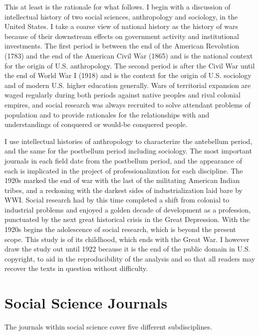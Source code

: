 \documentclass[]{book}
\theoremstyle{definition}
\theoremstyle{definition}
\theoremstyle{definition}
\theoremstyle{remark}
\begin{document}
This at least is the rationale for what follows. I begin with a
discussion of intellectual history of two social sciences, anthropology
and sociology, in the United States. I take a coarse view of national
history as the history of wars because of their downstream effects on
government activity and institutional investments. The first period is
between the end of the American Revolution (1783) and the end of the
American Civil War (1865) and is the national context for the origin of
U.S. anthropology. The second period is after the Civil War until the
end of World War I (1918) and is the context for the origin of U.S.
sociology and of modern U.S. higher education generally. Wars of
territorial expansion are waged regularly during both periods against
native peoples and rival colonial empires, and social research was
always recruited to solve attendant problems of population and to
provide rationales for the relationships with and understandings of
conquered or would-be conquered people.

I use intellectual histories of anthropology to characterize the
antebellum period, and the same for the postbellum period including
sociology. The most important journals in each field date from the
postbellum period, and the appearance of each is implicated in the
project of professionalization for each discipline. The 1920s marked the
end of war with the last of the militating American Indian tribes, and a
reckoning with the darkest sides of industrialization laid bare by WWI.
Social research had by this time completed a shift from colonial to
industrial problems and enjoyed a golden decade of development as a
profession, punctuated by the next great historical crisis in the Great
Depression. With the 1920s begins the adolescence of social research,
which is beyond the present scope. This study is of its childhood, which
ends with the Great War. I however draw the study out until 1922 because
it is the end of the public domain in U.S. copyright, to aid in the
reproducibility of the analysis and so that all readers may recover the
texts in question without difficulty.

\hypertarget{kd-dq2}{%
\section{Social Science Journals}\label{kd-dq2}}

The journals within social science cover five different subdisciplines.
\end{document}
